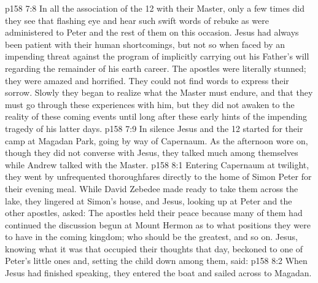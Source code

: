 \vs p158 7:8 In all the association of the 12 with their Master, only a few times did they see that flashing eye and hear such swift words of rebuke as were administered to Peter and the rest of them on this occasion. Jesus had always been patient with their human shortcomings, but not so when faced by an impending threat against the program of implicitly carrying out his Father’s will regarding the remainder of his earth career. The apostles were literally stunned; they were amazed and horrified. They could not find words to express their sorrow. Slowly they began to realize what the Master must endure, and that they must go through these experiences with him, but they did not awaken to the reality of these coming events until long after these early hints of the impending tragedy of his latter days.
\vs p158 7:9 In silence Jesus and the 12 started for their camp at Magadan Park, going by way of Capernaum. As the afternoon wore on, though they did not converse with Jesus, they talked much among themselves while Andrew talked with the Master.
\vs p158 8:1 Entering Capernaum at twilight, they went by unfrequented thoroughfares directly to the home of Simon Peter for their evening meal. While David Zebedee made ready to take them across the lake, they lingered at Simon’s house, and Jesus, looking up at Peter and the other apostles, asked:  The apostles held their peace because many of them had continued the discussion begun at Mount Hermon as to what positions they were to have in the coming kingdom; who should be the greatest, and so on. Jesus, knowing what it was that occupied their thoughts that day, beckoned to one of Peter’s little ones and, setting the child down among them, said: 
\vs p158 8:2 When Jesus had finished speaking, they entered the boat and sailed across to Magadan.
\quizlink
